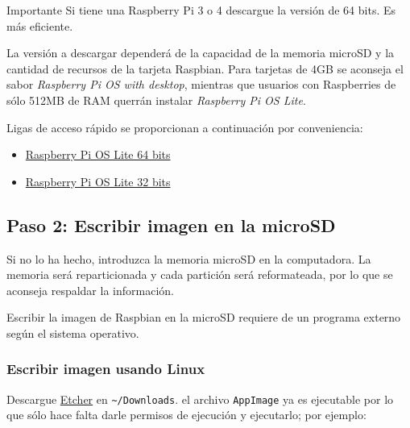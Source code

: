 \documentclass[letterpaper,10.5pt]{article}
\begin{document}
\begin{greenbox}{Importante}
Si tiene una Raspberry Pi 3 o 4 descargue la versión de 64 bits. Es más eficiente.
\end{greenbox}

La versión a descargar dependerá de la capacidad de la memoria microSD y la cantidad de recursos de la tarjeta Raspbian.
Para tarjetas de 4GB se aconseja el sabor \emph{Raspberry Pi OS with desktop}, mientras que usuarios con Raspberries de sólo 512MB de RAM querrán instalar \emph{Raspberry Pi OS Lite}.

Ligas de acceso rápido se proporcionan a continuación por conveniencia:

\begin{itemize}[noitemsep]
	\item \href{https://downloads.raspberrypi.com/raspios_lite_arm64/images/raspios_lite_arm64-2024-11-19/2024-11-19-raspios-bookworm-arm64-lite.img.xz}{Raspberry Pi OS Lite 64 bits}
	\item \href{https://downloads.raspberrypi.com/raspios_lite_armhf/images/raspios_lite_armhf-2024-11-19/2024-11-19-raspios-bookworm-armhf-lite.img.xz}{Raspberry Pi OS Lite 32 bits}
\end{itemize}

%
%
\subsection{Paso 2: Escribir imagen en la microSD}%
\label{sec:step2}
Si no lo ha hecho, introduzca la memoria microSD en la computadora.
La memoria será reparticionada y cada partición será reformateada, por lo que se aconseja respaldar la información.

Escribir la imagen de Raspbian en la microSD requiere de un programa externo según el sistema operativo.

%
%
\subsubsection{Escribir imagen usando Linux}%
Descargue \href{https://etcher.io/}{Etcher} en \texttt{\textasciitilde/Downloads}.
el archivo \texttt{AppImage} ya es ejecutable por lo que sólo hace falta darle permisos de ejecución y ejecutarlo; por ejemplo:
\end{document}
